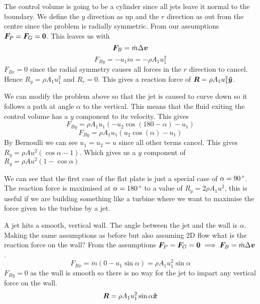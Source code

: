 \documentclass{article}
\begin{document}
    The control volume is going to be a cylinder since all jets leave it normal to the boundary.
    We define the \(y\) direction as up and the \(r\) direction as out from the centre since the problem is radially symmetric.
    From our assumptions \(\bm{F}_P = \bm{F}_G = \bm{0}\).
    This leaves us with
    \[\bm{F}_B = \dot m\Delta \bm{v}\]
    \[F_{By} = -u_1\dot m = -\rho A_1u_1^2\]
    \(F_{Br} = 0\) since the radial symmetry causes all forces in the \(r\) direction to cancel.
    Hence \(R_{y} = \rho A_1u_1^2\) and \(R_{r} = 0\).
    This gives a reaction force of \(\bm{R} = \rho A_1u_1^2 \bm{\hat{y}}\).
    
    We can modify the problem above so that the jet is caused to curve down so it follows a path at angle \(\alpha\) to the vertical.
    This means that the fluid exiting the control volume has a \(y\) component to its velocity.
    This gives
    \[F_{By} = \rho A_1u_1(-u_2\cos(180 - \alpha) - u_1)\]
    \[F_{By} = \rho A_1u_1(u_2\cos(\alpha) - u_1)\]
    By Bernoulli we can see \(u_1 = u_2 = u\) since all other terms cancel.
    This gives \(R_y = \rho A u^2(\cos \alpha - 1)\).
    Which gives us a \(y\) component of \(R_y = \rho A u^2(1 - \cos \alpha)\)
    
    We can see that the first case of the flat plate is just a special case of \(\alpha = \SI{90}{\SIUnitSymbolDegree}\).
    The reaction force is maximised at \(\alpha = \SI{180}{\SIUnitSymbolDegree}\) to a value of \(R_y = 2\rho A_1u^2\), this is useful if we are building something like a turbine where we want to maximise the force given to the turbine by a jet.
    
    A jet hits a smooth, vertical wall.
    The angle between the jet and the wall is \(\alpha\).
    Making the same assumptions as before but also assuming 2D flow what is the reaction force on the wall?
    From the assumptions \(\bm{F}_P = \bm{F}_G = \bm{0}\implies \bm{F}_B = \dot m\Delta\bm{v}\).
    \[F_{Bx} = \dot m(0 - u_1\sin\alpha) = \rho A_1 u_1^2\sin\alpha\]
    \(F_{By} = 0\) as the wall is smooth so there is no way for the jet to impart any vertical force on the wall.
    \[\bm{R} = \rho A_1u_1^2\sin\alpha \bm{\hat{x}}\]
    
    
\end{document}
